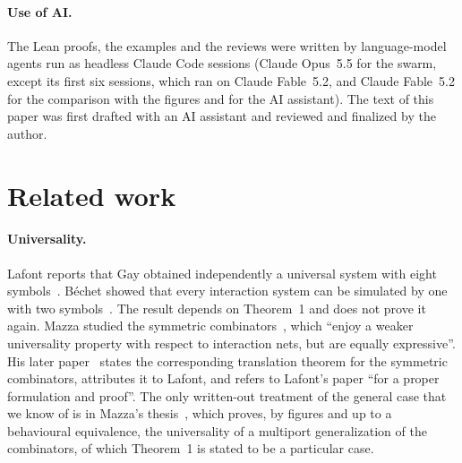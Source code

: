 \documentclass[11pt,a4paper]{article}
\newcommand{\pp}[1]{\cite[#1]{lafont1997}}
\begin{document}
\paragraph{Use of AI.}
The Lean proofs, the examples and the reviews were written by language-model agents run as
headless Claude Code sessions (Claude Opus~5.5 for the swarm, except its first six
sessions, which ran on Claude Fable~5.2, and Claude Fable~5.2 for the comparison with the
figures and for the AI assistant). The text of this paper was first
drafted with an AI assistant and reviewed and finalized by the author.

\section{Related work}
\label{sec:related}

\paragraph{Universality.}
Lafont reports that Gay obtained independently a universal system with eight
symbols~\pp{p.~70}. B\'echet showed that every interaction system can be simulated by one
with two symbols~\cite{bechet2001}. The result depends on Theorem~1 and does not prove it
again. Mazza studied the symmetric combinators~\cite{mazza2007}, which ``enjoy a weaker
universality property with respect to interaction nets, but are equally expressive''. His later
paper~\cite{mazza2009} states the corresponding translation theorem for the symmetric
combinators, attributes it to Lafont, and refers to Lafont's paper ``for a proper formulation
and proof''. The only written-out treatment of the general case that we know of is in Mazza's
thesis~\cite[Section~6.4]{mazza2006}, which proves, by figures and up to a behavioural
equivalence, the universality of a multiport generalization of the combinators, of which
Theorem~1 is stated to be a particular case.
\end{document}
